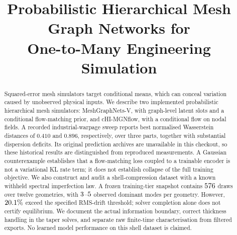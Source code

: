 \documentclass[11pt]{article}
\title{Probabilistic Hierarchical Mesh Graph Networks for\\
       One-to-Many Engineering Simulation}
\author{}
\date{}
\begin{document}
\maketitle

\begin{abstract}
Squared-error mesh simulators target conditional means, which can conceal
variation caused by unobserved physical inputs. We describe two implemented
probabilistic hierarchical mesh simulators: MeshGraphNets-V, with graph-level
latent slots and a conditional flow-matching prior, and cHI-MGNflow, with a
conditional flow on nodal fields. A recorded industrial-warpage sweep reports
best normalised Wasserstein distances of $0.410$ and $0.896$, respectively,
over three parts, together with substantial dispersion deficits. Its original
prediction archives are unavailable in this checkout, so these historical
results are distinguished from reproduced measurements. A Gaussian
counterexample establishes that a flow-matching loss coupled to a trainable
encoder is not a variational KL rate term; it does not establish collapse of
the full training objective. We also construct and audit a shell-compression
dataset with a known withheld spectral imperfection law. A frozen training-tier
snapshot contains $576$ draws over twelve geometries, with
$3$--$5$ observed dominant modes per geometry.
However, $20.1\%$ exceed the specified RMS-drift threshold;
solver completion alone does not certify equilibrium. We document the actual
information boundary, correct thickness handling in the taper solves, and
separate raw finite-time characterisation from filtered exports. No learned
model performance on this shell dataset is claimed.
\end{abstract}












\FloatBarrier


\end{document}
